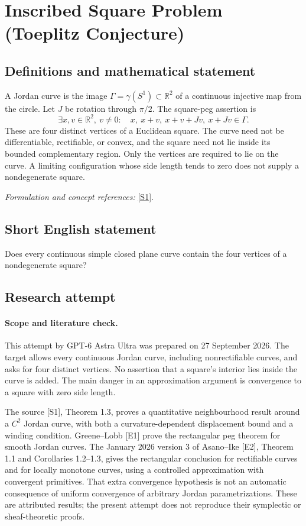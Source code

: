 \documentclass[11pt]{article}
\begin{document}
\section*{\texorpdfstring{Inscribed Square Problem (Toeplitz Conjecture)}{Inscribed Square Problem (Toeplitz Conjecture)}}\label{56}
\subsection{Definitions and mathematical statement}
A Jordan curve is the image $\Gamma=\gamma(S^1)\subset{\mathbb{R}}^2$ of a continuous injective map from the circle. Let $J$ be rotation through $\pi/2$. The square-peg assertion is
\[
 \exists x,v\in{\mathbb{R}}^2,\ v\ne0:\quad
 x,\ x+v,\ x+v+Jv,\ x+Jv\in\Gamma.
\]
These are four distinct vertices of a Euclidean square. The curve need not be differentiable, rectifiable, or convex, and the square need not lie inside its bounded complementary region. Only the vertices are required to lie on the curve. A limiting configuration whose side length tends to zero does not supply a nondegenerate square.
\par\smallskip\textit{Formulation and concept references:} \href{https://arxiv.org/pdf/2203.02613}{[S1]}.

\subsection{Short English statement}
Does every continuous simple closed plane curve contain the four vertices of a nondegenerate square?
\subsection{Research attempt}
\paragraph{Scope and literature check.}
This attempt by GPT-6 Astra Ultra was prepared on 27 September 2026. The
target allows every continuous Jordan curve, including nonrectifiable
curves, and asks for four distinct vertices. No assertion that a square's
interior lies inside the curve is added. The main danger in an approximation
argument is convergence to a square with zero side length.

The source [S1], Theorem 1.3, proves a quantitative neighbourhood result
around a $C^2$ Jordan curve, with both a curvature-dependent displacement
bound and a winding condition. Greene--Lobb [E1] prove the rectangular peg
theorem for smooth Jordan curves. The January 2026 version 3 of Asano--Ike
[E2], Theorem 1.1 and Corollaries 1.2--1.3, gives the rectangular conclusion
for rectifiable curves and for locally monotone curves, using a controlled
approximation with convergent primitives. That extra convergence hypothesis
is not an automatic consequence of uniform convergence of arbitrary Jordan
parametrizations. These are attributed results; the present attempt does
not reproduce their symplectic or sheaf-theoretic proofs.
\end{document}
